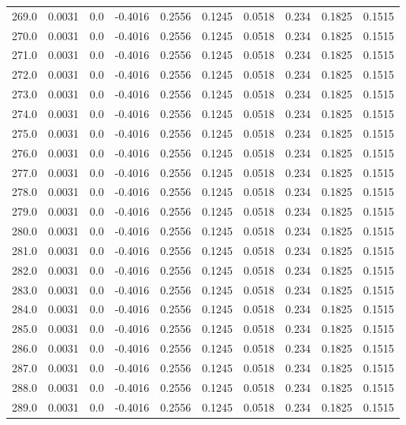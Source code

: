 \begin{longtable}{lrrrrrrrrr}
269.0 & 0.0031 & 0.0 & -0.4016 & 0.2556 & 0.1245 & 0.0518 & 0.234 & 0.1825 & 0.1515 \\
270.0 & 0.0031 & 0.0 & -0.4016 & 0.2556 & 0.1245 & 0.0518 & 0.234 & 0.1825 & 0.1515 \\
271.0 & 0.0031 & 0.0 & -0.4016 & 0.2556 & 0.1245 & 0.0518 & 0.234 & 0.1825 & 0.1515 \\
272.0 & 0.0031 & 0.0 & -0.4016 & 0.2556 & 0.1245 & 0.0518 & 0.234 & 0.1825 & 0.1515 \\
273.0 & 0.0031 & 0.0 & -0.4016 & 0.2556 & 0.1245 & 0.0518 & 0.234 & 0.1825 & 0.1515 \\
274.0 & 0.0031 & 0.0 & -0.4016 & 0.2556 & 0.1245 & 0.0518 & 0.234 & 0.1825 & 0.1515 \\
275.0 & 0.0031 & 0.0 & -0.4016 & 0.2556 & 0.1245 & 0.0518 & 0.234 & 0.1825 & 0.1515 \\
276.0 & 0.0031 & 0.0 & -0.4016 & 0.2556 & 0.1245 & 0.0518 & 0.234 & 0.1825 & 0.1515 \\
277.0 & 0.0031 & 0.0 & -0.4016 & 0.2556 & 0.1245 & 0.0518 & 0.234 & 0.1825 & 0.1515 \\
278.0 & 0.0031 & 0.0 & -0.4016 & 0.2556 & 0.1245 & 0.0518 & 0.234 & 0.1825 & 0.1515 \\
279.0 & 0.0031 & 0.0 & -0.4016 & 0.2556 & 0.1245 & 0.0518 & 0.234 & 0.1825 & 0.1515 \\
280.0 & 0.0031 & 0.0 & -0.4016 & 0.2556 & 0.1245 & 0.0518 & 0.234 & 0.1825 & 0.1515 \\
281.0 & 0.0031 & 0.0 & -0.4016 & 0.2556 & 0.1245 & 0.0518 & 0.234 & 0.1825 & 0.1515 \\
282.0 & 0.0031 & 0.0 & -0.4016 & 0.2556 & 0.1245 & 0.0518 & 0.234 & 0.1825 & 0.1515 \\
283.0 & 0.0031 & 0.0 & -0.4016 & 0.2556 & 0.1245 & 0.0518 & 0.234 & 0.1825 & 0.1515 \\
284.0 & 0.0031 & 0.0 & -0.4016 & 0.2556 & 0.1245 & 0.0518 & 0.234 & 0.1825 & 0.1515 \\
285.0 & 0.0031 & 0.0 & -0.4016 & 0.2556 & 0.1245 & 0.0518 & 0.234 & 0.1825 & 0.1515 \\
286.0 & 0.0031 & 0.0 & -0.4016 & 0.2556 & 0.1245 & 0.0518 & 0.234 & 0.1825 & 0.1515 \\
287.0 & 0.0031 & 0.0 & -0.4016 & 0.2556 & 0.1245 & 0.0518 & 0.234 & 0.1825 & 0.1515 \\
288.0 & 0.0031 & 0.0 & -0.4016 & 0.2556 & 0.1245 & 0.0518 & 0.234 & 0.1825 & 0.1515 \\
289.0 & 0.0031 & 0.0 & -0.4016 & 0.2556 & 0.1245 & 0.0518 & 0.234 & 0.1825 & 0.1515 \\

\end{longtable}
